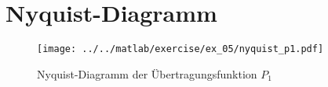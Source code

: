 \section{Nyquist-Diagramm}

\begin{figure}[h!]
	\centering
	\texttt{[image: ../../matlab/exercise/ex\_05/nyquist\_p1.pdf]}
	\caption{Nyquist-Diagramm der Übertragungsfunktion $P_1$}
	\label{fig:nyquist_p1}
\end{figure}
